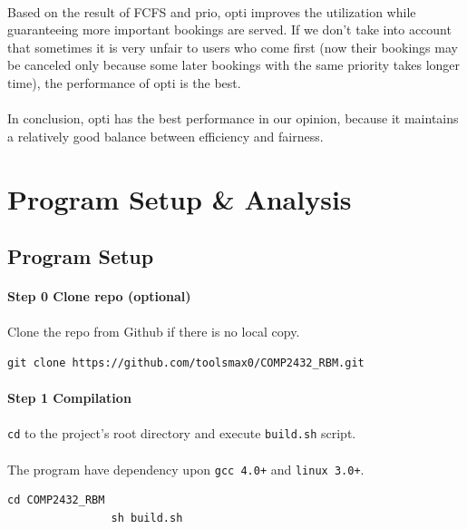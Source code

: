\documentclass{article}
\begin{document}
    \paragraph{}
        Based on the result of FCFS and prio, opti improves the utilization while guaranteeing more important bookings are served. If we don't take into account that sometimes it is very unfair to users who come first (now their bookings may be canceled only because some later bookings with the same priority takes longer time), the performance of opti is the best.
    \paragraph{}
        In conclusion, opti has the best performance in our opinion, because it maintains a relatively good balance between efficiency and fairness.
    \cleardoublepage
    \section{Program Setup \& Analysis}
        \subsection{Program Setup}
            \paragraph{Step 0 Clone repo (optional)}
            \paragraph{}
                Clone the repo from Github if there is no local copy.
            \begin{Verbatim}[gobble=8]
                git clone https://github.com/toolsmax0/COMP2432_RBM.git
            \end{Verbatim}
            \paragraph{Step 1 Compilation}
            \paragraph{}
                \texttt{cd} to the project's root directory and execute \texttt{build.sh} script.
            \paragraph{}
                The program have dependency upon \texttt{gcc 4.0+} and \texttt{linux 3.0+}.
            \begin{Verbatim}[gobble=8]
                cd COMP2432_RBM
                sh build.sh
            \end{Verbatim}
\end{document}
